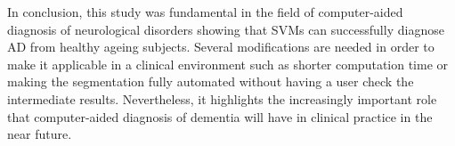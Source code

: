 \documentclass[11pt,a4paper,oneside]{report}
\begin{document}
In conclusion, this study was fundamental in the field of computer-aided diagnosis of neurological disorders showing that SVMs can successfully diagnose AD from healthy ageing subjects. Several modifications are needed in order to make it applicable in a clinical environment such as shorter computation time or making the segmentation fully automated without having a user check the intermediate results. Nevertheless, it highlights the increasingly important role that computer-aided diagnosis of dementia will have in clinical practice in the near future.


\nocite{*} %


\end{document}
